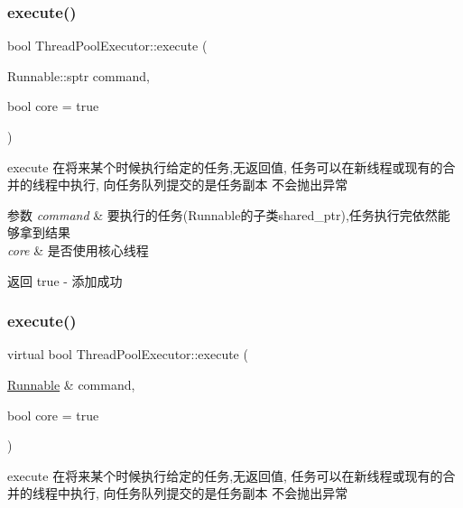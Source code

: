 \subsubsection{\texorpdfstring{execute()}{execute()}\hspace{0.1cm}{\footnotesize\ttfamily [1/3]}}
{\footnotesize\ttfamily bool Thread\+Pool\+Executor\+::execute (\begin{DoxyParamCaption}\item[{Runnable\+::sptr}]{command,  }\item[{bool}]{core = {\ttfamily true} }\end{DoxyParamCaption})}



execute 在将来某个时候执行给定的任务,无返回值, 任务可以在新线程或现有的合并的线程中执行, 向任务队列提交的是任务副本 不会抛出异常 


\begin{DoxyParams}{参数}
{\em command} & 要执行的任务(Runnable的子类shared\+\_\+ptr),任务执行完依然能够拿到结果 \\
\hline
{\em core} & 是否使用核心线程\\
\hline
\end{DoxyParams}
\begin{DoxyReturn}{返回}
true -\/ 添加成功 
\end{DoxyReturn}
\mbox{\label{classThreadPoolExecutor_a523df0545790ef03a82623b05e3b20f9}} 
\subsubsection{\texorpdfstring{execute()}{execute()}\hspace{0.1cm}{\footnotesize\ttfamily [2/3]}}
{\footnotesize\ttfamily virtual bool Thread\+Pool\+Executor\+::execute (\begin{DoxyParamCaption}\item[{\hyperlink{classRunnable}{Runnable} \&}]{command,  }\item[{bool}]{core = {\ttfamily true} }\end{DoxyParamCaption})\hspace{0.3cm}{\ttfamily [virtual]}}



execute 在将来某个时候执行给定的任务,无返回值, 任务可以在新线程或现有的合并的线程中执行, 向任务队列提交的是任务副本 不会抛出异常 


